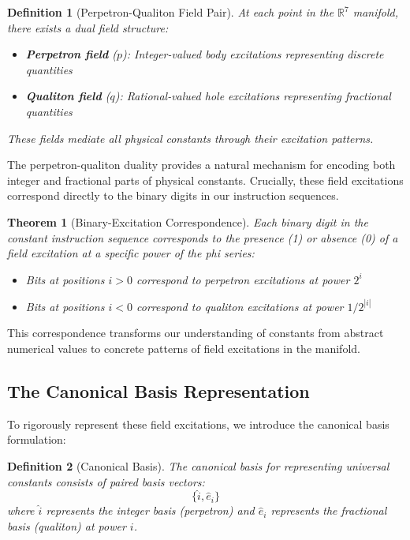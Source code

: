 \documentclass{article}
\newtheorem{theorem}{Theorem}
\newtheorem{definition}{Definition}
\begin{document}
\begin{definition}[Perpetron-Qualiton Field Pair]
At each point in the $\mathbb{R}^7$ manifold, there exists a dual field structure:
\begin{itemize}
\item \textbf{Perpetron field} ($p$): Integer-valued body excitations representing discrete quantities
\item \textbf{Qualiton field} ($q$): Rational-valued hole excitations representing fractional quantities
\end{itemize}
These fields mediate all physical constants through their excitation patterns.
\end{definition}

The perpetron-qualiton duality provides a natural mechanism for encoding both integer and fractional parts of physical constants. Crucially, these field excitations correspond directly to the binary digits in our instruction sequences.

\begin{theorem}[Binary-Excitation Correspondence]
Each binary digit in the constant instruction sequence corresponds to the presence (1) or absence (0) of a field excitation at a specific power of the phi series:
\begin{itemize}
\item Bits at positions $i > 0$ correspond to perpetron excitations at power $2^i$
\item Bits at positions $i < 0$ correspond to qualiton excitations at power $1/2^{|i|}$
\end{itemize}
\end{theorem}

This correspondence transforms our understanding of constants from abstract numerical values to concrete patterns of field excitations in the manifold.

\subsection{The Canonical Basis Representation}

To rigorously represent these field excitations, we introduce the canonical basis formulation:

\begin{definition}[Canonical Basis]
The canonical basis for representing universal constants consists of paired basis vectors:
\begin{equation}
\{\hat{i}, \hat{e}_i\}
\end{equation}
where $\hat{i}$ represents the integer basis (perpetron) and $\hat{e}_i$ represents the fractional basis (qualiton) at power $i$.
\end{definition}
\end{document}
